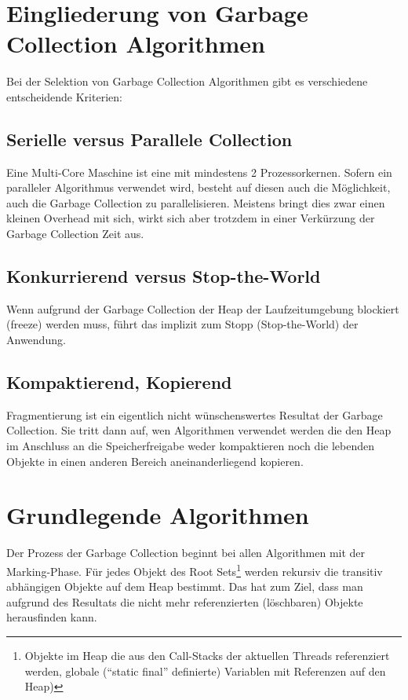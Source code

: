 \section{Eingliederung von Garbage Collection Algorithmen\cite[S. 5]{sunMemoryManagementWP}}
Bei der Selektion von Garbage Collection Algorithmen gibt es verschiedene entscheidende Kriterien:
\subsection{Serielle versus Parallele Collection}
Eine Multi-Core Maschine ist eine mit mindestens 2 Prozessorkernen. Sofern ein paralleler Algorithmus verwendet wird, besteht auf diesen auch die Möglichkeit, auch die Garbage Collection zu parallelisieren. Meistens bringt dies zwar einen kleinen Overhead mit sich, wirkt sich aber trotzdem in einer Verkürzung der Garbage Collection Zeit aus.

\subsection{Konkurrierend versus Stop-the-World}
Wenn aufgrund der Garbage Collection der Heap der Laufzeitumgebung blockiert (freeze) werden muss, führt das implizit zum Stopp (Stop-the-World) der Anwendung.


\subsection{Kompaktierend, Kopierend}
Fragmentierung ist ein eigentlich nicht wünschenswertes Resultat der Garbage Collection. Sie tritt dann auf, wen Algorithmen verwendet werden die den Heap im Anschluss an die Speicherfreigabe weder kompaktieren noch die lebenden Objekte in einen anderen Bereich aneinanderliegend kopieren.

\section{Grundlegende Algorithmen}
Der Prozess der Garbage Collection beginnt bei allen Algorithmen mit der Marking-Phase. Für jedes Objekt des Root Sets\footnote{Objekte im Heap die aus den Call-Stacks der aktuellen Threads referenziert werden, globale (``static final'' definierte) Variablen mit Referenzen auf den Heap)} werden rekursiv die transitiv abhängigen Objekte auf dem Heap bestimmt. Das hat zum Ziel, dass man aufgrund des Resultats die nicht mehr referenzierten (löschbaren) Objekte herausfinden kann.

